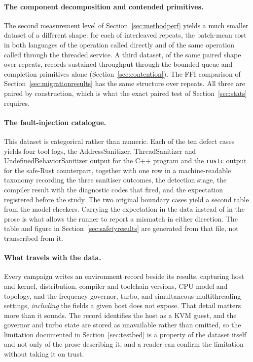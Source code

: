 \documentclass[english,twoside,openright,a4paper,censored,csm,software-track-2020]{HYthesisML}
\begin{document}
\paragraph{The component decomposition and contended primitives.}
The second measurement level of Section~\ref{sec:methodperf} yields a much smaller dataset of a
different shape: for each of \BudgetRepeats{} interleaved repeats, the batch-mean cost in both
languages of the operation called directly and of the same operation called through the threaded
service. A third dataset, of the same paired shape over \ContentionRepeats{} repeats, records
sustained throughput through the bounded queue and completion primitives alone
(Section~\ref{sec:contention}). The FFI comparison of Section~\ref{sec:migrationresults} has the
same structure over \FfiOpRepeats{} repeats. All three are paired by construction, which is what
the exact paired test of Section~\ref{sec:stats} requires.

\paragraph{The fault-injection catalogue.}
This dataset is categorical rather than numeric. Each of the ten defect cases yields four tool
logs, the AddressSanitizer, ThreadSanitizer and UndefinedBehaviorSanitizer output for the C++
program and the \texttt{rustc} output for the safe-Rust counterpart, together with one row in a
machine-readable taxonomy recording the three sanitiser outcomes, the detection stage, the
compiler result with the diagnostic codes that fired, and the expectation registered before the
study. The two original boundary cases yield a second table from the model checkers. Carrying the
expectation in the data instead of in the prose is what allows the runner to report a mismatch
in either direction. The table and figure in Section~\ref{sec:safetyresults} are generated from
that file, not transcribed from it.

\paragraph{What travels with the data.}
Every campaign writes an environment record beside its results, capturing host and kernel,
distribution, compiler and toolchain versions, CPU model and topology, and the frequency
governor, turbo, and simultaneous-multithreading settings, \emph{including} the fields a given
host does not expose. That detail matters more than it sounds. The record identifies the host as a
KVM guest, and the governor and turbo state are stored as unavailable rather than omitted, so the
limitation documented in Section~\ref{sec:testbed} is a property of the dataset itself and not only of the prose
describing it, and a reader can confirm the limitation without taking it on trust.
\end{document}
